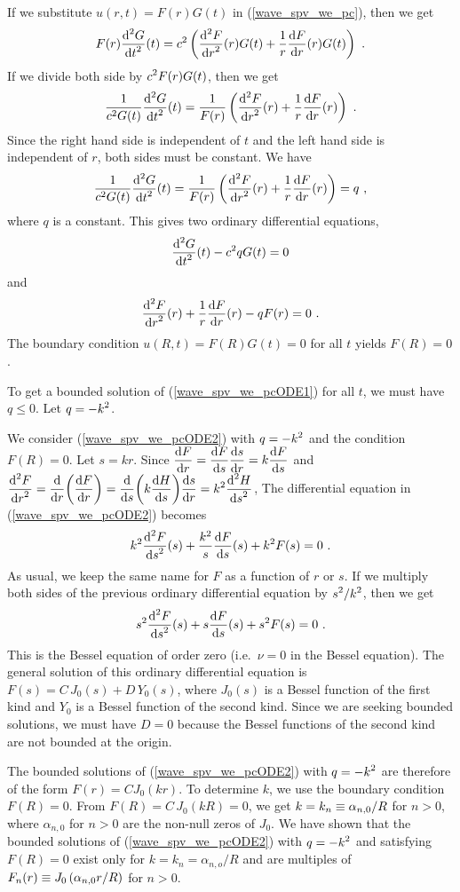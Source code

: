 \begin{egg}
If we substitute $u(r,t) = F(r)G(t)$ in (\ref{wave_spv_we_pc}), then we get
\[
F(r)\dydxn{G}{t}{2}(t) = c^2 \left( \dydxn{F}{r}{2}(r)G(t) +
  \frac{1}{r} \dydx{F}{r}(r)G(t) \right) \ .
\]
If we divide both side by $\DS c^2F(r)G(t)$, then we get
\[
\frac{1}{c^2G(t)} \dydxn{G}{t}{2}(t) = \frac{1}{F(r)}
\left(\dydxn{F}{r}{2}(r) + \frac{1}{r} \dydx{F}{r}(r)\right) \ .
\]
Since the right hand side is independent of $t$ and the left hand side
is independent of $r$, both sides must be constant.  We have
\[
\frac{1}{c^2G(t)} \dydxn{G}{t}{2}(t) = \frac{1}{F(r)}
\left(\dydxn{F}{r}{2}(r) + \frac{1}{r} \dydx{F}{r}(r)\right) = q \ ,
\]
where $q$ is a constant.  This gives two ordinary differential equations,
\begin{equation} \label{wave_spv_we_pcODE1}
\dydxn{G}{t}{2}(t) - c^2 q G(t) = 0
\end{equation}
and
\begin{equation} \label{wave_spv_we_pcODE2}
\dydxn{F}{r}{2}(r) + \frac{1}{r} \dydx{F}{r}(r) - q F(r) =0 \ .
\end{equation}
The boundary condition $u(R,t)=F(R)G(t)=0$ for all $t$ yields
$F(R)=0$.

To get a bounded solution of (\ref{wave_spv_we_pcODE1}) for all $t$, we
must have $q\leq 0$.  Let $\DS q= -k^2$.

We consider (\ref{wave_spv_we_pcODE2}) with $\DS q= -k^2$
and the condition $F(R)=0$.  Let $s = kr$.  Since
$\DS \dydx{F}{r} = \dydx{F}{s} \dydx{s}{r} = k\dydx{F}{s}$
and
$\DS \dydxn{F}{r}{2} = \dfdx{\left(\dydx{F}{r}\right)}{r}
= \dfdx{\left(k\dydx{H}{s}\right)}{s} \dydx{s}{r}
= k^2 \dydxn{H}{s}{2}$,
The differential equation in (\ref{wave_spv_we_pcODE2}) becomes
\[
k^2\dydxn{F}{s}{2}(s) + \frac{k^2}{s} \dydx{F}{s}(s) + k^2 F(s) = 0 \ .
\]
As usual, we keep the same name for $F$ as a function of $r$ or $s$.
If we multiply both sides of the previous ordinary differential
equation by $\DS s^2/k^2$, then we get
\[
s^2\dydxn{F}{s}{2}(s) + s \dydx{F}{s}(s) + s^2 F(s) = 0 \ .
\]
This is the Bessel equation of order zero (i.e.\ $\nu=0$ in the Bessel
equation).  The general solution of this ordinary differential equation is
$F(s) = C\, J_0(s) + D\, Y_0(s)$, where $J_0(s)$ is a Bessel function of
the first kind and $Y_0$ is a Bessel function of the second kind.
Since we are seeking bounded solutions, we must have
$D = 0$ because the Bessel functions of the second kind are
not bounded at the origin.

The bounded solutions of (\ref{wave_spv_we_pcODE2}) with
$\DS q= -k^2$ are
therefore of the form $F(r) = C J_0\left(kr\right)$.  To determine
$k$, we use the boundary condition $F(R)=0$.  From
$F(R) = C\,J_0(kR)=0$, we get
$k = \DS k_n \equiv \alpha_{n,0}/R$ for $n>0$,
where $\alpha_{n,0}$ for $n>0$ are the non-null zeros of $J_0$.
We have shown that the bounded solutions of (\ref{wave_spv_we_pcODE2}) with
$\DS q= -k^2$ and satisfying $F(R)=0$ exist only for
$k=k_n = \alpha_{n,o}/R$ and are multiples of
$\DS F_n(r) \equiv J_0\left(\alpha_{n,0}r/R\right)$
for $n>0$.


\end{egg}
